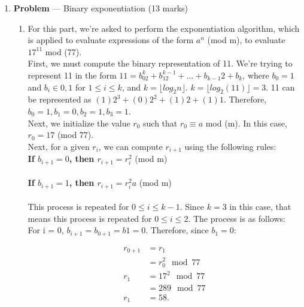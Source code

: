\documentclass[11pt]{article}
\theoremstyle{definition}
\newcounter{problem}
\begin{document}
\begin{enumerate}
\begin{enumerate}
\end{enumerate}

\newpage


\item[] \textbf{Problem \theproblem} ---  Binary exponentiation (13 marks)

\begin{enumerate}
\item For this part, we're asked to perform the exponentiation algorithm, which is applied to evaluate expressions of the form $a^n$ (mod m), to evaluate $17^{11}$ mod (77).\\

First, we must compute the binary representation of 11. We're trying to represent 11 in the form $11 = b_02^k + b_12^{k-1} + \ldots + b_{k-1}2 + b_k$, where $b_0 = 1$ and $b_i \in {0, 1}$ for $1 \leq i \leq k$, and $k = \lfloor log_2n \rfloor$. $k = \lfloor log_2(11) \rfloor = 3$. 11 can be represented as $(1)2^3 + (0)2^2 + (1)2 + (1)1$. Therefore, $b_0 = 1, b_1 = 0, b_2 = 1, b_3 = 1$.\\

Next, we initialize the value $r_0$ such that $r_0 \equiv a$ mod (m). In this case, $r_0 = 17$ (mod 77).\\

Next, for a given $r_i$, we can compute $r_{i+1}$ using the following rules:\\

\textbf{If $b_{i+1} = 0$, then $r_{i+1} = r_i^2$} (mod m) \\ \\
\textbf{If $b_{i+1} = 1$, then $r_{i+1} = r_i^2 a$} (mod m) \\ \\

This process is repeated for $0 \leq i \leq k - 1$. Since $k = 3$ in this case, that means this process is repeated for $0 \leq i \leq 2$. The process is as follows: \\

For i = 0, $b_{i+1} = b_{0+1} = b{1} = 0$. Therefore, since $b_1 = 0$:

\begin{align*}
    r_{0+1} &= r_1 \\
    &= r_0^2 \mod{77} \\
    r_1 &= 17^2 \mod{77} \\
    &= 289 \mod{77} \\
    r_1 &= 58.
\end{align*}


\end{enumerate}
\end{enumerate}
\end{document}
